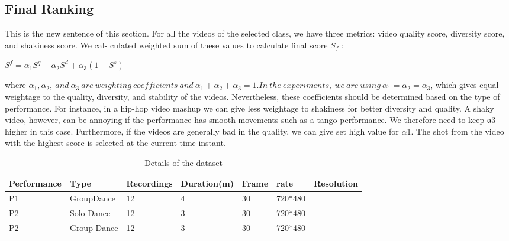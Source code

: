\documentclass{sig-alternate}
\begin{document}
{{{\subsection{Final Ranking}
This is the new sentence of this section.
For all the videos of the selected class, we have three metrics:
video quality score, diversity score, and shakiness score. We cal-
culated weighted sum of these values to calculate final score $S_f$ :
\begin{center}
$S^f = \alpha_1S^q + \alpha_2S^d + \alpha_3(1 − S^s )$
\end{center}

where $\alpha_1 , \alpha_2 ,\ and\ \alpha_3\ are\ weighting\ coefficients\ and\ \alpha_1 + \alpha_2 +
\alpha_3 = 1. In\ the\ experiments,\ we\ are\ using\ \alpha_1 = \alpha_2 = \alpha_3 $, which gives equal weightage to the quality, diversity, and stability of the videos. Nevertheless, these coefficients should be determined based on the type of performance. For instance, in a hip-hop
video mashup we can give less weightage to shakiness for better diversity and quality. A shaky video, however, can be annoying if the performance has smooth movements such as a tango performance.
We therefore need to keep α3 higher in this case. Furthermore, if
the videos are generally bad in the quality, we can give set high
value for $\alpha$1. The shot from the video with the highest score is
selected at the current time instant.

\begin{table}
\centering
\caption{Details of the dataset}
\begin{tabular}{l|l|l|l|l|l} \hline
 Performance&Type &Recordings& Duration(m)&Frame&rate&Resolution\\ \hline
P1&GroupDance&12& 4& 30& 720*480\\ \hline
P2&Solo Dance&12&3 &30 &720*480\\ \hline
P2&Group Dance&12&3 &30 &720*480 \hline
\end{tabular}
\end{table}



}}}
\end{document}
